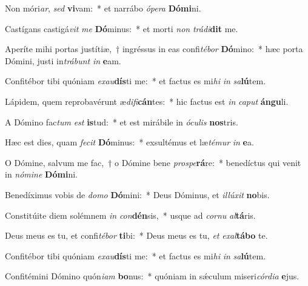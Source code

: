 \item Non móri\textit{ar}, \textit{sed} \textbf{vi}vam:~* et narrábo \textit{ó}\textit{pe}\textit{ra} \textbf{Dó}\textbf{mi}ni.
\item Castígans castigá\textit{vit} \textit{me} \textbf{Dó}minus:~* et morti \textit{non} \textit{trá}\textit{di}\textbf{dit} me.
\item Aperíte mihi portas justítiæ,~† ingréssus in eas confi\textit{té}\textit{bor} \textbf{Dó}mino:~* hæc porta Dómini, justi in\textit{trá}\textit{bunt} \textit{in} \textbf{e}am.
\item Confitébor tibi quóniam \textit{ex}\textit{au}\textbf{dís}ti me:~* et factus es mi\textit{hi} \textit{in} \textit{sa}\textbf{lú}tem.
\item Lápidem, quem reprobavérunt æ\textit{di}\textit{fi}\textbf{cán}tes:~* hic factus est \textit{in} \textit{ca}\textit{put} \textbf{án}\textbf{gu}li.
\item A Dómino fac\textit{tum} \textit{est} \textbf{is}tud:~* et est mirábile in \textit{ó}\textit{cu}\textit{lis} \textbf{nos}tris.
\item Hæc est dies, quam \textit{fe}\textit{cit} \textbf{Dó}minus:~* exsultémus et læ\textit{té}\textit{mur} \textit{in} \textbf{e}a.
\item O Dómine, salvum me fac,~† o Dómine bene \textit{pro}\textit{spe}\textbf{rá}re:~* benedíctus qui venit in \textit{nó}\textit{mi}\textit{ne} \textbf{Dó}\textbf{mi}ni.
\item Benedíximus vobis de \textit{do}\textit{mo} \textbf{Dó}mini:~* Deus Dóminus, et \textit{il}\textit{lú}\textit{xit} \textbf{no}bis.
\item Constitúite diem solémnem \textit{in} \textit{con}\textbf{dén}sis,~* usque ad \textit{cor}\textit{nu} \textit{al}\textbf{tá}ris.
\item Deus meus es tu, et confi\textit{té}\textit{bor} \textbf{ti}bi:~* Deus meus es tu, \textit{et} \textit{ex}\textit{al}\textbf{tá}\textbf{bo} te.
\item Confitébor tibi quóniam \textit{ex}\textit{au}\textbf{dís}ti me:~* et factus es mi\textit{hi} \textit{in} \textit{sa}\textbf{lú}tem.
\item Confitémini Dómino quón\textit{i}\textit{am} \textbf{bo}nus:~* quóniam in sǽculum miseri\textit{cór}\textit{di}\textit{a} \textbf{e}jus.
